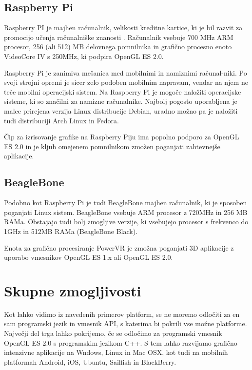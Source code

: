 \subsection{Raspberry Pi}
\label{sec:raspberryPi}

Raspberry PI je majhen računalnik, velikosti kreditne kartice, ki je bil razvit za promocijo učenja računalniške znanosti \cite{rasPi}. Računalnik vsebuje 700 MHz ARM procesor, 256 (ali 512) MB delovnega pomnilnika in grafično procesno enoto VideoCore IV s 250MHz, ki podpira OpenGL ES 2.0.

Raspberry Pi je zanimiva mešanica med mobilnimi in namiznimi računal-niki. Po svoji strojni opremi je sicer zelo podoben mobilnim napravam, vendar na njem ne teče mobilni operacijski sistem. Na Raspberry Pi je mogoče naložiti operacijske sisteme, ki so značilni za namizne računalnike. Najbolj pogosto uporabljena je malce prirejena verzija Linux distribucije Debian, uradno možno pa je naložiti tudi distribuciji Arch Linux in Fedora.

Čip za izrisovanje grafike na Raspberry Piju ima popolno podporo za OpenGL ES 2.0 in je kljub omejenem pomnilnikom zmožen poganjati zahtevnejše aplikacije.

\subsection{BeagleBone}
\label{sec:beagleBone}

Podobno kot Raspberry Pi je tudi BeagleBone \cite{beagleBone} majhen računalnik, ki je sposoben poganjati Linux sistem. BeagleBone vsebuje ARM procesor z 720MHz in 256 MB RAMa. Obstajajo tudi bolj zmogljive verzije, ki vsebujejo procesor s frekvenco do 1GHz in 512MB RAMa (BeagleBone Black). 

Enota za grafično procesiranje PowerVR je zmožna poganjati 3D aplikacije z uporabo vmesnikov OpenGL ES 1.x ali OpenGL ES 2.0.

\section{Skupne zmogljivosti}

Kot lahko vidimo iz navedenih primerov platform, se ne moremo odločiti za en sam programski jezik in vmesnik API, s katerima bi pokrili vse možne platforme. Največji del trga lahko pokrijemo, če se odločimo za programski vmesnik OpenGL ES 2.0 s programskim jezikom C++. S  tem lahko razvijamo grafično intenzivne aplikacije na Wndows, Linux in Mac OSX, kot tudi na mobilnih platformah Android, iOS, Ubuntu, Sailfish in BlackBerry.

